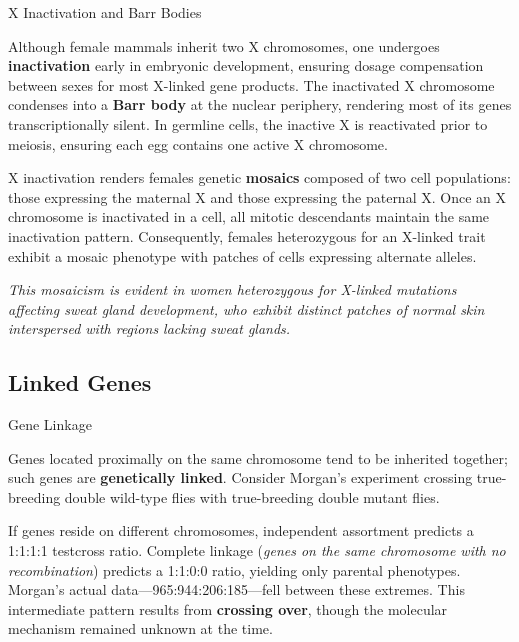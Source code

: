 \documentclass[10pt]{article}
\begin{document}
    \begin{core}{X Inactivation and Barr Bodies}

      Although female mammals inherit two X chromosomes, one undergoes \textbf{inactivation} early in embryonic development, ensuring dosage compensation between sexes for most X-linked gene products. The inactivated X chromosome condenses into a \textbf{Barr body} at the nuclear periphery, rendering most of its genes transcriptionally silent. In germline cells, the inactive X is reactivated prior to meiosis, ensuring each egg contains one active X chromosome.

      X inactivation renders females genetic \textbf{mosaics} composed of two cell populations: those expressing the maternal X and those expressing the paternal X. Once an X chromosome is inactivated in a cell, all mitotic descendants maintain the same inactivation pattern. Consequently, females heterozygous for an X-linked trait exhibit a mosaic phenotype with patches of cells expressing alternate alleles.


      \textit{This mosaicism is evident in women heterozygous for X-linked mutations affecting sweat gland development, who exhibit distinct patches of normal skin interspersed with regions lacking sweat glands.}

    \end{core}

  \subsection{Linked Genes}

    \begin{core}[label=core:gene_linkage]{Gene Linkage}

      Genes located proximally on the same chromosome tend to be inherited together; such genes are \textbf{genetically linked}. Consider Morgan's experiment crossing true-breeding double wild-type flies with true-breeding double mutant flies.


      If genes reside on different chromosomes, independent assortment predicts a 1:1:1:1 testcross ratio. Complete linkage (\textit{genes on the same chromosome with no recombination}) predicts a 1:1:0:0 ratio, yielding only parental phenotypes. Morgan's actual data---965:944:206:185---fell between these extremes. This intermediate pattern results from \textbf{crossing over}, though the molecular mechanism remained unknown at the time.

    \end{core}    
\end{document}
